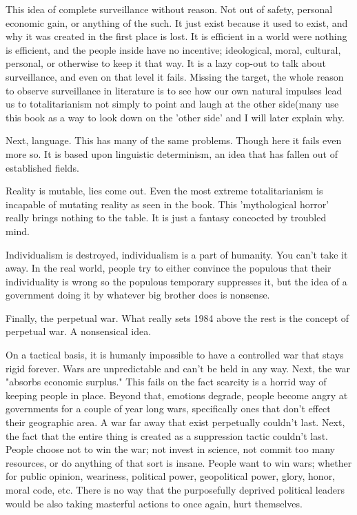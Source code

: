 \par This idea of complete surveillance without reason. Not out of safety, personal economic gain, or anything of the such. It just exist because it used to exist, and why it was created in the first place is lost. It is efficient in a world were nothing is efficient, and the people inside have no incentive; ideological, moral, cultural, personal, or otherwise to keep it that way. It is a lazy cop-out to talk about surveillance, and even on that level it fails. Missing the target, the whole reason to observe surveillance in literature is to see how our own natural impulses lead us to totalitarianism not simply to point and laugh at the other side(many use this book as a way to look down on the 'other side' and I will later explain why.
\par Next, language. This has many of the same problems. Though here it fails even more so. It is based upon linguistic determinism, an idea that has fallen out of established fields.
\par Reality is mutable, lies come out. Even the most extreme totalitarianism is incapable of mutating reality as seen in the book. This 'mythological horror' really brings nothing to the table. It is just a fantasy concocted by troubled mind.
\par Individualism is destroyed, individualism is a part of humanity. You can't take it away. In the real world, people try to either convince the populous that their individuality is wrong so the populous temporary suppresses it, but the idea of a government doing it by whatever big brother does is nonsense.
\par Finally, the perpetual war. What really sets 1984 above the rest is the concept of perpetual war. A nonsensical idea.
\par On a tactical basis, it is humanly impossible to have a controlled war that stays rigid forever. Wars are unpredictable and can't be held in any way. Next, the war "absorbs economic surplus." This fails on the fact scarcity is a horrid way of keeping people in place. Beyond that, emotions degrade, people become angry at governments for a couple of year long wars, specifically ones that don't effect their geographic area. A war far away that exist perpetually couldn't last. Next, the fact that the entire thing is created as a suppression tactic couldn't last. People choose not to win the war; not invest in science, not commit too many resources, or do anything of that sort is insane. People want to win wars; whether for public opinion, weariness, political power, geopolitical power, glory, honor, moral code, etc. There is no way that the purposefully deprived political leaders would be also taking masterful actions to once again, hurt themselves.
